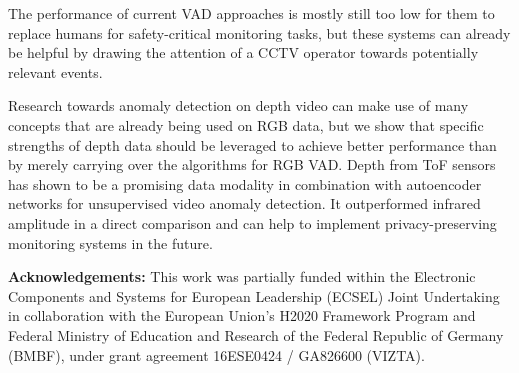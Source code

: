 \documentclass[10pt,twocolumn,letterpaper]{article}
\begin{document}
The performance of current VAD approaches is mostly still too low for them to replace humans for safety-critical monitoring tasks, but these systems can already be helpful by drawing the attention of a CCTV operator towards potentially relevant events.

Research towards anomaly detection on depth video can make use of many concepts that are already being used on RGB data, but we show that specific strengths of depth data should be leveraged to achieve better performance than by merely carrying over the algorithms for RGB VAD. Depth from ToF sensors has shown to be a promising data modality in combination with autoencoder networks for unsupervised video anomaly detection. It outperformed infrared amplitude in a direct comparison and can help to implement privacy-preserving monitoring systems in the future.

\textbf{Acknowledgements:} This work was partially funded within the Electronic Components and Systems for European Leadership (ECSEL) Joint Undertaking in collaboration with the European Union’s H2020 Framework Program and Federal Ministry of Education and Research of the Federal Republic of Germany (BMBF), under grant agreement 16ESE0424 / GA826600 (VIZTA).

{\small


}
\end{document}
